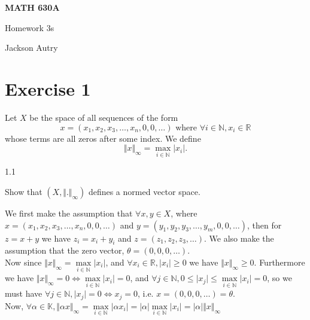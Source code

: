 \documentclass[12pt,a4paper]{article}
\author{Jackson Autry}
\begin{document}

	
\begin{center}
	\textbf{MATH 630A} %
	
		Homework 3s	%
		
		Jackson Autry
\end{center}

\section*{Exercise 1}
\begin{ques}
	Let $X$ be the space of all sequences of the form
	$$x = (x_1,x_2,x_3,\ldots,x_n,0,0,\ldots) \text{ where } \forall i \in \mathbb{N}, x_i \in \mathbb{R}$$
	whose terms are all zeros after some index. We define
	$$\Vert x \Vert_{\infty} = \underset{i \in \mathbb{N}}{\max} \vert x_i \vert.$$
\end{ques}

1.1
\begin{ques}
	Show that $(X,\Vert . \Vert_{\infty})$ defines a normed vector space.
\end{ques}
	
	We first make the assumption that $\forall x,y \in X$, where $x = (x_1,x_2,x_3,\ldots,x_n,0,0,\ldots)$ and $y =  (y_1,y_2,y_3,\ldots,y_m,0,0,\ldots)$, then for $z = x + y$ we have $z_i = x_i + y_i$ and $z = (z_1,z_2,z_3,\ldots)$. We also make the assumption that the zero vector, $\theta = (0,0,0,\ldots).$\\
	
	Now since $\Vert x \Vert_{\infty} = \underset{i \in \mathbb{N}}{\max} \vert x_i \vert$, and $\forall x_i \in \mathbb{R}, \vert x_i \vert \ge 0$ we have $\Vert x \Vert_{\infty} \ge 0$. Furthermore we have $\Vert x \Vert_{\infty} = 0 \Longleftrightarrow \underset{i \in \mathbb{N}}{\max} \vert x_i \vert = 0$, and $\forall j \in \mathbb{N}, 0 \le \vert x_j \vert \le \underset{i \in \mathbb{N}}{\max} \vert x_i \vert = 0$, so we must have $\forall j \in \mathbb{N}, \vert x_j \vert = 0 \Longleftrightarrow x_j = 0$, i.e. $x = (0,0,0,\ldots) = \theta$.\\
	
	Now, $\forall \alpha \in \mathbb{K}, \Vert \alpha x \Vert_{\infty} = \underset{i \in \mathbb{N}}{\max} \vert \alpha x_i \vert = \vert \alpha \vert \underset{i \in \mathbb{N}}{\max} \vert x_i \vert = \vert \alpha \vert \Vert x \Vert_{\infty}$\\
	
\end{document}
